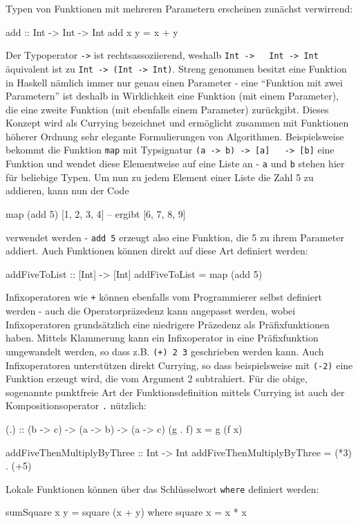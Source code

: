 \documentclass[11pt, a4paper, bibgerm]{book}
\newcommand\icode[1]{\lstinline?#1?}
\begin{document}
Typen von Funktionen mit mehreren Parametern erscheinen
zunächst verwirrend:
\begin{code}
add :: Int -> Int -> Int
add x y = x + y  
\end{code}
Der Typoperator \icode{->} ist rechtsassoziierend, weshalb \icode{Int ->
  Int -> Int} äquivalent ist zu \icode{Int -> (Int -> Int)}. Streng
genommen besitzt eine Funktion in Haskell nämlich immer nur genau einen
Parameter - eine "`Funktion mit zwei Parametern"' ist deshalb in
Wirklichkeit eine Funktion (mit einem Parameter), die eine zweite
Funktion (mit ebenfalls einem Parameter) zurückgibt. Dieses Konzept wird
als Currying bezeichnet und ermöglicht zusammen mit Funktionen höherer
Ordnung sehr elegante Formulierungen von Algorithmen. Beispielsweise
bekommt die Funktion \icode{map} mit Typsignatur \icode{(a -> b) -> [a]
  -> [b]} eine Funktion und wendet diese Elementweise auf eine Liste an
- \icode{a} und \icode{b} stehen hier für beliebige Typen. Um nun zu
jedem Element einer Liste die Zahl 5 zu addieren, kann nun der Code
\begin{code}
map (add 5) [1, 2, 3, 4]  -- ergibt [6, 7, 8, 9]
\end{code}
verwendet werden - \icode{add 5} erzeugt also eine Funktion, die 5 zu
ihrem Parameter addiert. Auch Funktionen können direkt auf diese Art
definiert werden:
\begin{code}
addFiveToList :: [Int] -> [Int]
addFiveToList = map (add 5)
\end{code}

Infixoperatoren wie \icode{+} können ebenfalls vom Programmierer selbst
definiert werden - auch die Operatorpräzedenz kann angepasst werden,
wobei Infixoperatoren grundsätzlich eine niedrigere Präzedenz als
Präfixfunktionen haben. Mittels Klammerung kann ein Infixoperator in eine
Präfixfunktion umgewandelt werden, so dass z.B. \icode{(+) 2 3}
geschrieben werden kann. Auch Infixoperatoren unterstützen direkt
Currying, so dass beispielsweise mit \icode{(-2)} eine Funktion erzeugt
wird, die vom Argument 2 subtrahiert. Für die obige, sogenannte
punktfreie Art der Funktionsdefinition mittels Currying ist auch der
Kompositionsoperator \icode{.} nützlich:
\begin{code}
(.) :: (b -> c) -> (a -> b) -> (a -> c)
(g . f) x = g (f x)

addFiveThenMultiplyByThree :: Int -> Int
addFiveThenMultiplyByThree = (*3) . (+5)
\end{code}

Lokale Funktionen können über das Schlüsselwort \icode{where} definiert
werden:
\begin{code}
sumSquare x y = square (x + y)
  where
    square x = x * x
\end{code}
\end{document}
